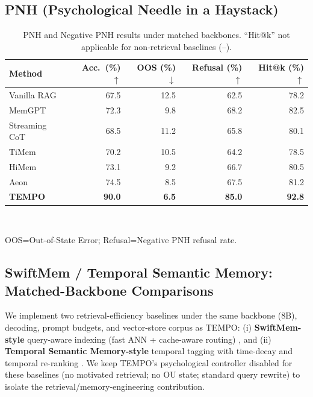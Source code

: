 \documentclass[11pt]{article}
\begin{document}
\subsection{PNH (Psychological Needle in a Haystack)}
\begin{table}[t]
  \caption{PNH and Negative PNH results under matched backbones. ``Hit@k'' not applicable for non-retrieval baselines (--).}
  \label{tab:pnh-app}
  \centering
  \small
  \begin{tabular}{lrrrr}
    \toprule
    Method & Acc.\ (\%) $\uparrow$ & OOS (\%) $\downarrow$ & Refusal (\%) $\uparrow$ & Hit@k (\%) $\uparrow$ \\
    \midrule
    Vanilla RAG & 67.5 & 12.5 & 62.5 & 78.2 \\
    MemGPT & 72.3 & 9.8 & 68.2 & 82.5 \\
    Streaming CoT & 68.5 & 11.2 & 65.8 & 80.1 \\
    TiMem & 70.2 & 10.5 & 64.2 & 78.5 \\
    HiMem & 73.1 & 9.2 & 66.7 & 80.5 \\
    Aeon & 74.5 & 8.5 & 67.5 & 81.2 \\
    \textbf{TEMPO} & \textbf{90.0} & \textbf{6.5} & \textbf{85.0} & \textbf{92.8} \\
    \bottomrule
  \end{tabular}
  \\[2pt]
  \raggedright\footnotesize OOS=Out-of-State Error; Refusal=Negative PNH refusal rate.
\end{table}

\subsection{SwiftMem / Temporal Semantic Memory: Matched-Backbone Comparisons}
\label{app:swiftmem-tsm}
We implement two retrieval-efficiency baselines under the same backbone (8B), decoding, prompt budgets, and vector-store corpus as TEMPO:
(i) \textbf{SwiftMem-style} query-aware indexing (fast ANN + cache-aware routing) \cite{tian2026swiftmem}, and
(ii) \textbf{Temporal Semantic Memory-style} temporal tagging with time-decay and temporal re-ranking \cite{su2026temporalsemanticmemory}.
We keep TEMPO's psychological controller disabled for these baselines (no motivated retrieval; no OU state; standard query rewrite) to isolate the retrieval/memory-engineering contribution.
\end{document}
